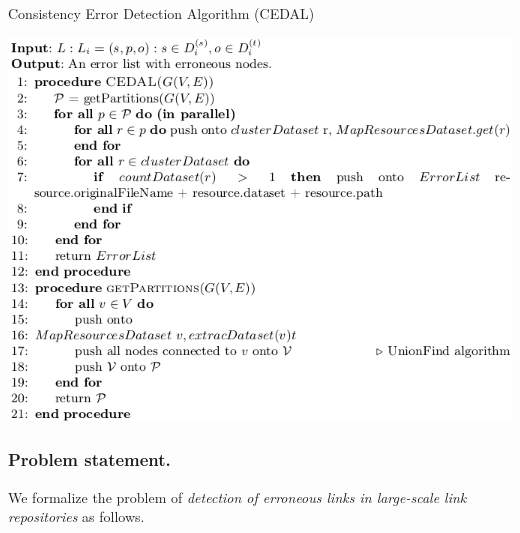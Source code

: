%		

\begin{algorithm} [htb] 
	\caption{Consistency Error Detection Algorithm (CEDAL)}
	\label{alg:err}
	\includegraphics[width=\linewidth]{sections/img/algCedal.png}
\end{algorithm}

\subsubsection{Problem statement.}
We formalize the problem of \textit{detection of erroneous links in large-scale link repositories} as follows.


